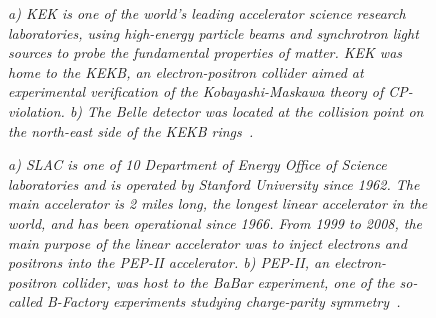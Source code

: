 \begin{figure}[!htbp]
  \centering {} 
  \caption{\textit{a) KEK is one of the world's leading accelerator science
      research laboratories, using high-energy particle beams and synchrotron
      light sources to probe the fundamental properties of matter. KEK was home
      to the KEKB, an electron-positron collider aimed at experimental
      verification of the Kobayashi-Maskawa theory of CP-violation. b) The Belle
      detector was located at the collision point on the north-east side of the
      KEKB rings~\cite{Keklab}.}}
  \label{kek_figure}
\end{figure}

\begin{figure}[!htbp]
  \centering {} 
  \caption{\textit{a) SLAC is one of 10 Department of Energy Office of Science
      laboratories and is operated by Stanford University since 1962. The main
      accelerator is 2 miles long, the longest linear accelerator in the world,
      and has been operational since 1966. From 1999 to 2008, the main purpose
      of the linear accelerator was to inject electrons and positrons into the
      PEP-II accelerator. b) PEP-II, an electron-positron collider, was host to
      the BaBar experiment, one of the so-called B-Factory experiments studying
      charge-parity symmetry~\cite{Slaclab}.}}
  \label{slac_figure}
\end{figure}

